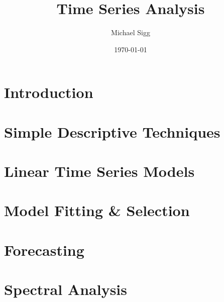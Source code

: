 \documentclass[11pt]{article}
\title{Time Series Analysis}
\author{Michael Sigg}
\date{\today}
\begin{document}
\maketitle
\tableofcontents

\section{Introduction}


\section{Simple Descriptive Techniques}


\section{Linear Time Series Models}


\section{Model Fitting \& Selection}


\section{Forecasting}


\section{Spectral Analysis}

\end{document}
